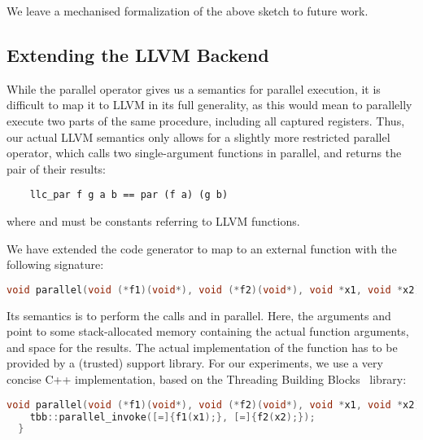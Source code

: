 \documentclass[runningheads]{llncs}
\begin{document}
  We leave a mechanised formalization of the above sketch to future work.


  \subsection{Extending the LLVM Backend}
  While the parallel operator gives us a semantics for parallel execution,
  it is difficult to map it to LLVM in its full generality, as this would mean to parallelly
  execute two parts of the same procedure, including all captured registers.
  Thus, our actual LLVM semantics only allows for a slightly more restricted parallel operator,
  which calls two single-argument functions in parallel, and returns the pair of their results:
  \begin{lstlisting}
    llc_par f g a b == par (f a) (g b)
  \end{lstlisting}
  where  and  must be constants referring to LLVM functions.

  We have extended the code generator to map  to an external  function with the following signature:
  \begin{lstlisting}[language=C++]
    void parallel(void (*f1)(void*), void (*f2)(void*), void *x1, void *x2)
  \end{lstlisting}
  Its semantics is to perform the calls  and  in parallel.
  Here, the arguments  and  point to some stack-allocated memory
  containing the actual function arguments, and space for the results.
  The actual implementation of the  function has to be provided by a (trusted) support library.
  For our experiments, we use a very concise C++ implementation, based on the Threading Building Blocks~\cite{TBB} library:
  \begin{lstlisting}[language=C++]
  void parallel(void (*f1)(void*), void (*f2)(void*), void *x1, void *x2) {
    tbb::parallel_invoke([=]{f1(x1);}, [=]{f2(x2);});
  }
  \end{lstlisting}




\end{document}

